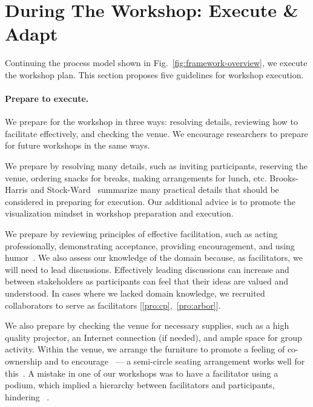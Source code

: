 \section{During The Workshop: Execute \& Adapt}
\label{sec:during}

Continuing the \workshop process model shown in Fig.~\ref{fig:framework-overview}, we execute the workshop plan. This section proposes five guidelines for workshop execution.

\paragraph{Prepare to execute.} We prepare for the workshop in three ways: resolving details, reviewing how to facilitate effectively, and checking the venue. We encourage researchers to prepare for future workshops in the same ways.

We prepare by resolving many details, such as inviting participants, reserving the venue, ordering snacks for breaks, making arrangements for lunch, etc. Brooks-Harris and Stock-Ward~\cite{Brooks-Harris1999} summarize many practical details that should be considered in preparing for execution. Our additional advice is to promote the visualization mindset in workshop preparation and execution.

We prepare by reviewing principles of effective facilitation, such as acting professionally, demonstrating acceptance, providing encouragement, and using humor~\cite{CreativeEducationFoundation2015,Brooks-Harris1999,Gray2010,Hamilton2016,Stanfield2002}. We also assess our knowledge of the domain because, as facilitators, we will need to lead discussions. Effectively leading discussions can increase \collegiality and \trust between stakeholders as participants can feel that their ideas are valued and understood. In cases where we lacked domain knowledge, we recruited collaborators to serve as facilitators [\ref{pro:cp},~\ref{pro:arbor}]. 

We also prepare by checking the venue for necessary supplies, such as a high quality projector, an Internet connection (if needed), and ample space for group activity. Within the venue, we arrange the furniture to promote a feeling of co-ownership and to encourage \agency~--- a semi-circle seating arrangement works well for this~\cite{Vosko1991}. A mistake in one of our workshops was to have a facilitator using a podium, which implied a hierarchy between facilitators and participants, hindering \collegiality~\cite{Rogers2016}.


